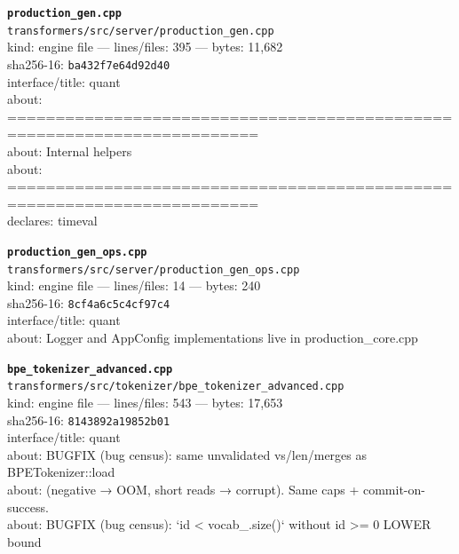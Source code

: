 \noindent\textbf{\texttt{production\_gen.cpp}}\\
\texttt{transformers/src/server/production\_gen.cpp}\\
kind: engine file --- lines/files: 395 --- bytes: 11,682\\
sha256-16: \texttt{ba432f7e64d92d40}\\
interface/title: quant\\
about: ========================================================================\\
about: Internal helpers\\
about: ========================================================================\\
declares: timeval\\
\vspace*{6.0pt}

\noindent\textbf{\texttt{production\_gen\_ops.cpp}}\\
\texttt{transformers/src/server/production\_gen\_ops.cpp}\\
kind: engine file --- lines/files: 14 --- bytes: 240\\
sha256-16: \texttt{8cf4a6c5c4cf97c4}\\
interface/title: quant\\
about: Logger and AppConfig implementations live in production\_core.cpp\\
\vspace*{6.0pt}

\noindent\textbf{\texttt{bpe\_tokenizer\_advanced.cpp}}\\
\texttt{transformers/src/tokenizer/bpe\_tokenizer\_advanced.cpp}\\
kind: engine file --- lines/files: 543 --- bytes: 17,653\\
sha256-16: \texttt{8143892a19852b01}\\
interface/title: quant\\
about: BUGFIX (bug census): same unvalidated vs/len/merges as BPETokenizer::load\\
about: (negative → OOM, short reads → corrupt). Same caps + commit-on-success.\\
about: BUGFIX (bug census): `id < vocab\_.size()` without id >= 0 LOWER bound\\
\vspace*{6.0pt}
\newpage

